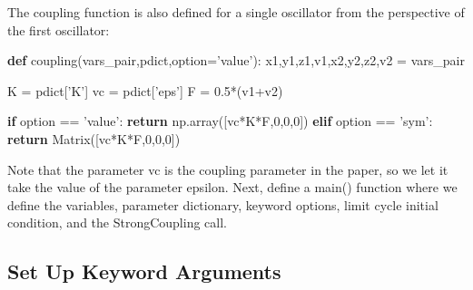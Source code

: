 \documentclass[english,a4paper,oneside]{article}
\newenvironment{Shaded}{}{}
\newcommand{\KeywordTok}[1]{\textcolor[rgb]{0.00,0.44,0.13}{\textbf{#1}}}
\newcommand{\DecValTok}[1]{\textcolor[rgb]{0.25,0.63,0.44}{#1}}
\newcommand{\FloatTok}[1]{\textcolor[rgb]{0.25,0.63,0.44}{#1}}
\newcommand{\StringTok}[1]{\textcolor[rgb]{0.25,0.44,0.63}{#1}}
\newcommand{\ControlFlowTok}[1]{\textcolor[rgb]{0.00,0.44,0.13}{\textbf{#1}}}
\newcommand{\OperatorTok}[1]{\textcolor[rgb]{0.40,0.40,0.40}{#1}}
\newcommand{\NormalTok}[1]{#1}
\begin{document}
The coupling function is also defined for a single oscillator from the
perspective of the first oscillator:

\begin{Shaded}
\begin{Highlighting}[]
\KeywordTok{def}\NormalTok{ coupling(vars_pair,pdict,option}\OperatorTok{=}\StringTok{'value'}\NormalTok{):}
\NormalTok{    x1,y1,z1,v1,x2,y2,z2,v2 }\OperatorTok{=}\NormalTok{ vars_pair}
    
\NormalTok{    K }\OperatorTok{=}\NormalTok{ pdict[}\StringTok{'K'}\NormalTok{]}
\NormalTok{    vc }\OperatorTok{=}\NormalTok{ pdict[}\StringTok{'eps'}\NormalTok{]}
\NormalTok{    F }\OperatorTok{=} \FloatTok{0.5}\OperatorTok{*}\NormalTok{(v1}\OperatorTok{+}\NormalTok{v2)}
    
    \ControlFlowTok{if}\NormalTok{ option }\OperatorTok{==} \StringTok{'value'}\NormalTok{:}
        \ControlFlowTok{return}\NormalTok{ np.array([vc}\OperatorTok{*}\NormalTok{K}\OperatorTok{*}\NormalTok{F,}\DecValTok{0}\NormalTok{,}\DecValTok{0}\NormalTok{,}\DecValTok{0}\NormalTok{])}
    \ControlFlowTok{elif}\NormalTok{ option }\OperatorTok{==} \StringTok{'sym'}\NormalTok{:}
        \ControlFlowTok{return}\NormalTok{ Matrix([vc}\OperatorTok{*}\NormalTok{K}\OperatorTok{*}\NormalTok{F,}\DecValTok{0}\NormalTok{,}\DecValTok{0}\NormalTok{,}\DecValTok{0}\NormalTok{])}
\end{Highlighting}
\end{Shaded}

Note that the parameter vc is the coupling parameter in the paper, so we
let it take the value of the parameter epsilon. Next, define a main()
function where we define the variables, parameter dictionary, keyword
options, limit cycle initial condition, and the StrongCoupling call.

\subsection{Set Up Keyword Arguments}\label{set-up-keyword-arguments}
\end{document}
